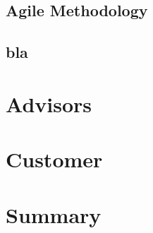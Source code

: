 \subsection{Agile Methodology}

\subsection{bla}


\section{Advisors}

\section{Customer}

\section{Summary}

